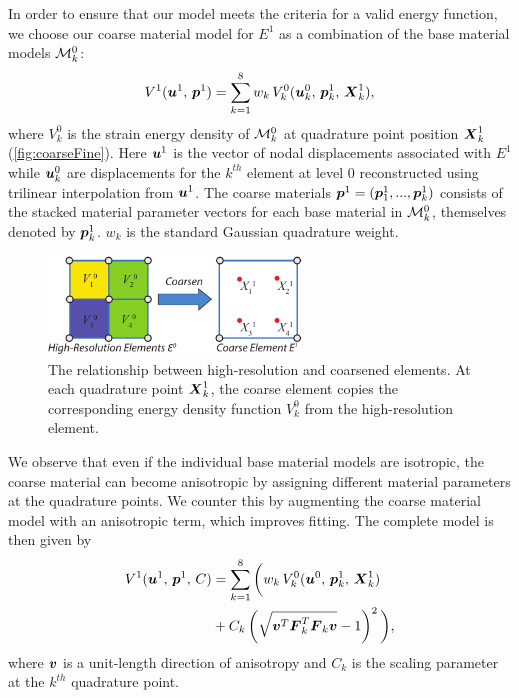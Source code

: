 In order to ensure that our model meets the criteria for a valid energy function, we choose our coarse material model for $\mathit{E}^1$ as a combination of the base material models $\mathcal{M}_k^0$:
\begin{align}
V^1(\mbox{$\bm{u}$}^1, \, \mbox{$\bm{p}$}^1) = \sum_{k=1}^8 w_k \, V_k^0(\mbox{$\bm{u}$}_k^0, \, \mbox{$\bm{p}$}_k^1, \, \mbox{$\bm{X}$}_k^1),
\label{eq:materialModel}
\end{align}
where $V_k^0$ is the strain energy density of $\mathcal{M}_k^0$ at quadrature point position $\mbox{$\bm{X}$}_k^1$ (\autoref{fig:coarseFine}). Here $\mbox{$\bm{u}$}^1$ is the vector of nodal displacements associated with $\mathit{E}^1$ while $\mbox{$\bm{u}$}_k^0$ are displacements for the $k^{th}$ element at level $0$ reconstructed using trilinear interpolation from $\mbox{$\bm{u}$}^1$.
The coarse materials $\mbox{$\bm{p}$}^1=(\mbox{$\bm{p}$}_1^1,...,\mbox{$\bm{p}$}_k^1)$ consists of the stacked material parameter vectors for each base material in $\mathcal{M}_k^0$, themselves denoted by $\mbox{$\bm{p}$}_k^1$.  $w_k$ is the standard Gaussian quadrature weight.

\begin{figure}
	\centering
	\includegraphics[width=0.6\textwidth]{images/coarseFine.pdf}
	\caption{The relationship between high-resolution and coarsened elements. At each quadrature point $\mbox{$\bm{X}$}_k^1$, the coarse element copies the corresponding energy density function $V_k^0$ from the high-resolution element.}
	\label{fig:coarseFine}
\end{figure}

We observe that even if the individual base material models are isotropic, the coarse material can become anisotropic by assigning different material parameters at the quadrature points. We counter this by augmenting the coarse material model with an anisotropic term, which improves fitting.
The complete model is then given by
\begin{align}
\begin{split}
V^1(\mbox{$\bm{u}$}^1, \, \mbox{$\bm{p}$}^1, \, C) &= \sum_{k=1}^8 \bigg( w_k \, V_k^0(\mbox{$\bm{u}$}^0, \,\mbox{$\bm{p}$}_k^1, \, \mbox{$\bm{X}$}_k^1)\\
& + C_k\left( \sqrt{\mbox{$\bm{v}$}^T\mbox{$\bm{F}$}_k^T\mbox{$\bm{F}$}_k\mbox{$\bm{v}$}} - 1\right)^2\bigg),\\
\label{eq:materialModel2}
\end{split}
\end{align}
where $\mbox{$\bm{v}$}$ is a unit-length direction of anisotropy and $C_k$ is the scaling parameter at the $k^{th}$ quadrature point. 

